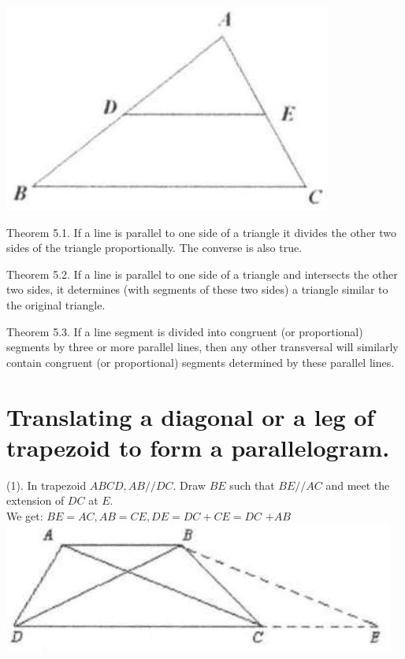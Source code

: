 \documentclass[10pt]{article}
\begin{document}
\begin{center}
\includegraphics[max width=\textwidth]{2025_04_17_97bc1f7e44d93c271a88g-101(1)}
\end{center}

Theorem 5.1. If a line is parallel to one side of a triangle it divides the other two sides of the triangle proportionally. The converse is also true.

Theorem 5.2. If a line is parallel to one side of a triangle and intersects the other two sides, it determines (with segments of these two sides) a triangle similar to the original triangle.

Theorem 5.3. If a line segment is divided into congruent (or proportional) segments by three or more parallel lines, then any other transversal will similarly contain congruent (or proportional) segments determined by these parallel lines.

\section*{Translating a diagonal or a leg of trapezoid to form a parallelogram.}
(1). In trapezoid \(A B C D, A B / / D C\). Draw \(B E\) such that \(B E / / A C\) and meet the extension of \(D C\) at \(E\).\\
We get: \(B E=A C, A B=C E, D E=D C+C E=D C\) \(+A B\)\\
\includegraphics[max width=\textwidth, center]{2025_04_17_97bc1f7e44d93c271a88g-101}
\end{document}
